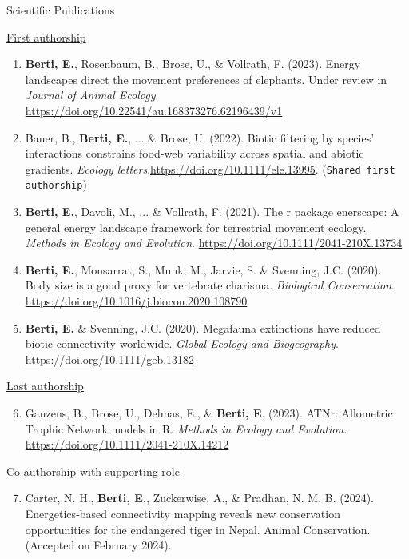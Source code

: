 \documentclass{resume} %
\begin{document}
\clearpage
\begin{rSection}{Scientific Publications}

{\underline{First authorship}}
\begin{enumerate}[leftmargin=0pt]
    \itemsep-1ex
    \item{\textbf{Berti, E.}, Rosenbaum, B., Brose, U., \& Vollrath, F. (2023). Energy landscapes direct the movement preferences of elephants. Under review in \textit{Journal of Animal Ecology}. \url{https://doi.org/10.22541/au.168373276.62196439/v1}}
    \item{Bauer, B., \textbf{Berti, E.}, ... \& Brose, U. (2022). Biotic filtering by species’ interactions constrains food-web variability across spatial and abiotic gradients. \textit{Ecology letters}.\url{https://doi.org/10.1111/ele.13995}. (\texttt{Shared first authorship})}
    \item{\textbf{Berti, E.}, Davoli, M., ... \& Vollrath, F. (2021). The r package enerscape: A general energy landscape framework for terrestrial movement ecology. \textit{Methods in Ecology and Evolution}. \url{https://doi.org/10.1111/2041-210X.13734}}
    \item{\textbf{Berti, E.}, Monsarrat, S., Munk, M., Jarvie, S. \& Svenning, J.C. (2020). Body size is a good proxy for vertebrate charisma. \textit{Biological Conservation}. \url{https://doi.org/10.1016/j.biocon.2020.108790}}
    \item{\textbf{Berti, E.} \& Svenning, J.C. (2020). Megafauna extinctions have reduced biotic connectivity worldwide. \textit{Global Ecology and Biogeography}. \url{https://doi.org/10.1111/geb.13182}}
\end{enumerate}
{\underline{Last authorship}}
\begin{enumerate}[leftmargin=0pt]
    \setcounter{enumi}{5}
    \itemsep-1ex
    \item{Gauzens, B., Brose, U., Delmas, E., \& \textbf{Berti, E}. (2023). ATNr: Allometric Trophic Network models in R. \textit{Methods in Ecology and Evolution}. \url{https://doi.org/10.1111/2041-210X.14212}}
\end{enumerate}
{\underline{Co-authorship with supporting role}}
\begin{enumerate}[leftmargin=0pt]
    \setcounter{enumi}{6}
    \itemsep-1ex
    \item Carter, N. H., \textbf{Berti, E.}, Zuckerwise, A., \& Pradhan, N. M. B. (2024). Energetics‐based connectivity mapping reveals new conservation opportunities for the endangered tiger in Nepal. Animal Conservation. (Accepted on February 2024).

\end{enumerate}
\end{rSection}
\end{document}
